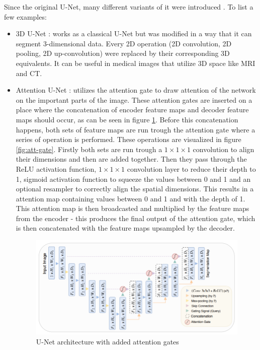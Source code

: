 Since the original U-Net, many different variants of it were introduced \cite{Siddique2021}. To list a few examples:

\begin{itemize}
    \item 3D U-Net \cite{Çiçek2016}: works as a classical U-Net but was modified in a way that it can segment 3-dimensional data. Every 2D operation (2D convolution, 2D pooling, 2D up-convolution) were replaced by their corresponding  3D equivalents. It can be useful in medical images that utilize 3D space like MRI and CT.
    \item Attention U-Net \cite{Oktay2018}: utilizes the attention gate to draw attention of the network on the important parts of the image. These attention gates are inserted on a place where the concatenation of encoder feature maps and decoder feature maps should occur, as can be seen in figure \ref{fig:att-unet}. Before this concatenation happens, both sets of feature maps are run trough the attention gate where a series of operation is performed. These operations are visualized in figure \ref{fig:att-gate}. Firstly both sets are run trough a $1\times1\times1$ convolution to align their dimensions and then are added together. Then they pass through the ReLU activation function, $1\times1\times1$ convolution layer to reduce their depth to 1, sigmoid activation function to squeeze the values between 0 and 1 and an optional resampler to correctly align the spatial dimensions. This results in a attention map containing values between 0 and 1 and with the depth of 1. This attention map is then broadcasted and multiplied by the feature maps from the encoder - this produces the final output of the attention gate, which is then concatenated with the feature maps upsampled by the decoder.

    \begin{figure}[H]
    \begin{centering}
    \includegraphics[width=12cm]{assets/images/att-unet.png}
    \par\end{centering}
    \caption{U-Net architecture with added attention gates \cite{Oktay2018}}
    \label{fig:att-unet}
    \end{figure}


\end{itemize}
